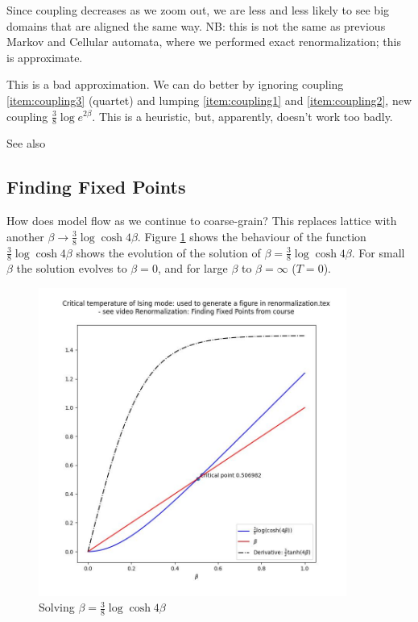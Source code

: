 \documentclass[]{article}
\begin{document}
Since coupling decreases as we zoom out, we are less and less likely to see big domains that are aligned the same way. NB: this is not the same as previous Markov and Cellular automata, where we performed exact renormalization; this is approximate.

This is a bad approximation. We can do better by ignoring coupling \ref{item:coupling3} (quartet) and lumping \ref{item:coupling1} and \ref{item:coupling2}, new coupling $\frac{3}{8} \log{e^{2\beta} }$. This is a heuristic, but, apparently, doesn't work too badly.


See also \cite[Chapter 14]{kadanoff2000statistical}


\subsection{Finding Fixed Points}

How does model flow as we continue to coarse-grain? This replaces lattice with another  $\beta\rightarrow\frac{3}{8} \log{\cosh{4\beta} }$. Figure \ref{fig:beta} shows the behaviour of the function $\frac{3}{8} \log{\cosh{4\beta} }$ shows the evolution of the solution of  $\beta=\frac{3}{8} \log{\cosh{4\beta} }$. For small $\beta$ the solution evolves to $\beta=0$, and for large $\beta$ to $\beta=\infty$ ($T=0$).


\begin{figure}[H]
	\caption{Solving $\beta=\frac{3}{8} \log{\cosh{4\beta} }$}\label{fig:beta}
	\includegraphics[width=0.9\textwidth]{beta}
\end{figure}
\end{document}
